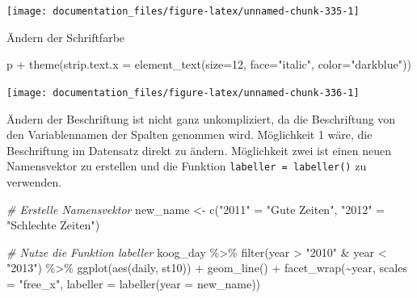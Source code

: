 \documentclass[
]{article}
\newenvironment{Shaded}{\begin{snugshade}}{\end{snugshade}}
\newcommand{\AttributeTok}[1]{\textcolor[rgb]{0.77,0.63,0.00}{#1}}
\newcommand{\CommentTok}[1]{\textcolor[rgb]{0.56,0.35,0.01}{\textit{#1}}}
\newcommand{\DecValTok}[1]{\textcolor[rgb]{0.00,0.00,0.81}{#1}}
\newcommand{\FunctionTok}[1]{\textcolor[rgb]{0.00,0.00,0.00}{#1}}
\newcommand{\NormalTok}[1]{#1}
\newcommand{\OtherTok}[1]{\textcolor[rgb]{0.56,0.35,0.01}{#1}}
\newcommand{\SpecialCharTok}[1]{\textcolor[rgb]{0.00,0.00,0.00}{#1}}
\newcommand{\StringTok}[1]{\textcolor[rgb]{0.31,0.60,0.02}{#1}}
\begin{document}
\begin{center}\texttt{[image: documentation\_files/figure-latex/unnamed-chunk-335-1]} \end{center}

Ändern der Schriftfarbe

\begin{Shaded}
\begin{Highlighting}[]
\NormalTok{p }\SpecialCharTok{+} \FunctionTok{theme}\NormalTok{(}\AttributeTok{strip.text.x =} \FunctionTok{element\_text}\NormalTok{(}\AttributeTok{size=}\DecValTok{12}\NormalTok{, }\AttributeTok{face=}\StringTok{"italic"}\NormalTok{, }\AttributeTok{color=}\StringTok{"darkblue"}\NormalTok{))}
\end{Highlighting}
\end{Shaded}

\begin{center}\texttt{[image: documentation\_files/figure-latex/unnamed-chunk-336-1]} \end{center}

Ändern der Beschriftung ist nicht ganz unkompliziert, da die Beschriftung von den Variablennamen der Spalten genommen wird. Möglichkeit 1 wäre, die Beschriftung im Datensatz direkt zu ändern. Möglichkeit zwei ist einen neuen Namensvektor zu erstellen und die Funktion \texttt{labeller\ =\ labeller()} zu verwenden.

\begin{Shaded}
\begin{Highlighting}[]
\CommentTok{\# Erstelle Namensvektor}
\NormalTok{new\_name }\OtherTok{\textless{}{-}} \FunctionTok{c}\NormalTok{(}\StringTok{"2011"} \OtherTok{=} \StringTok{"Gute Zeiten"}\NormalTok{, }\StringTok{"2012"} \OtherTok{=} \StringTok{"Schlechte Zeiten"}\NormalTok{)}

\CommentTok{\# Nutze die Funktion labeller}
\NormalTok{koog\_day }\SpecialCharTok{\%\textgreater{}\%}
  \FunctionTok{filter}\NormalTok{(year }\SpecialCharTok{\textgreater{}} \StringTok{"2010"} \SpecialCharTok{\&}\NormalTok{ year }\SpecialCharTok{\textless{}} \StringTok{"2013"}\NormalTok{) }\SpecialCharTok{\%\textgreater{}\%}
  \FunctionTok{ggplot}\NormalTok{(}\FunctionTok{aes}\NormalTok{(daily, st10)) }\SpecialCharTok{+}
  \FunctionTok{geom\_line}\NormalTok{() }\SpecialCharTok{+}
  \FunctionTok{facet\_wrap}\NormalTok{(}\SpecialCharTok{\textasciitilde{}}\NormalTok{year, }\AttributeTok{scales =} \StringTok{"free\_x"}\NormalTok{, }\AttributeTok{labeller =} \FunctionTok{labeller}\NormalTok{(}\AttributeTok{year =}\NormalTok{ new\_name))}
\end{Highlighting}
\end{Shaded}
\end{document}
